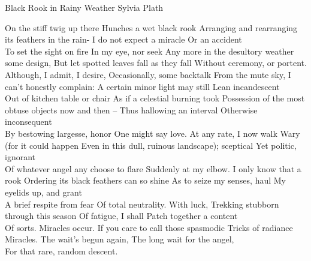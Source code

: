 \begin{poem}
 {Black Rook in Rainy Weather}
 {Sylvia Plath}

 On the stiff twig up there 
 Hunches a wet black rook
 Arranging and rearranging its feathers in the rain-
 I do not expect a miracle
 Or an accident\\

 To set the sight on fire
 In my eye, nor seek
 Any more in the desultory weather some design,
 But let spotted leaves fall as they fall
 Without ceremony, or portent.\\

 Although, I admit, I desire,
 Occasionally, some backtalk
 From the mute sky, I can't honestly complain:
 A certain minor light may still 
 Lean incandescent\\

 Out of kitchen table or chair
 As if a celestial burning took
 Possession of the most obtuse objects now and then --
 Thus hallowing an interval
 Otherwise inconsequent \\

 By bestowing largesse, honor
 One might say love. At any rate, I now walk
 Wary (for it could happen
 Even in this dull, ruinous landscape); sceptical
 Yet politic, ignorant\\

 Of whatever angel any choose to flare
 Suddenly at my elbow. I only know that a rook
 Ordering its black feathers can so shine
 As to seize my senses, haul 
 My eyelids up, and grant \\

 A brief respite from fear
 Of total neutrality. With luck,
 Trekking stubborn through this season
 Of fatigue, I shall 
 Patch together a content\\

 Of sorts. Miracles occur.
 If you care to call those spasmodic
 Tricks of radiance
 Miracles. The wait's begun again,
 The long wait for the angel,\\

 For that rare, random descent.
\end{poem}


